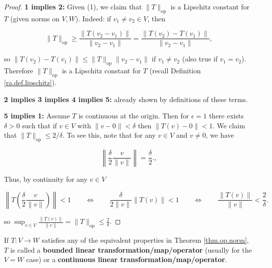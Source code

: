 \begin{proof}

\textbf{1 implies 2:} Given (1), we claim that \(\lVert T \rVert_{\text{op}}\) is a Lipschitz constant for \(T\) (given norms on \(V, W\)). Indeed: if \(v_1 \neq v_2 \in V\), then 

\[
\lVert T \rVert_\text{op} \geq  \frac{ \lVert T(v_2 -v_1) \rVert}{\lVert v_2 - v_1 \rVert} = \frac{ \lVert T(v_2) - T(v_1) \rVert}{\lVert v_2 - v_1 \rVert},
\]

so \( \lVert T(v_2) - T(v_1) \rVert \leq \lVert T \rVert_{\text{op}} \lVert v_2 - v_1 \rVert\) if \(v_1 \neq v_2\) (also true if \(v_1 = v_2\)). Therefore \(\lVert T \rVert_{\text{op}}\) is a Lipschitz constant for \(T\) (recall Definition \ref{ra.def.lipschitz}).

\textbf{2 implies 3 implies 4 implies 5:} already shown by definitions of these terms.

\textbf{5 implies 1:} Assume \(T\) is continuous at the origin. Then for \(\epsilon = 1\) there exists \(\delta > 0\) such that if \(v \in V\) with \(\lVert v - 0 \rVert < \delta\) then \(\lVert T(v) - 0 \rVert < 1\). We claim that \(\lVert T \rVert_{\text{op}} \leq 2/\delta\). To see this, note that for any \(v  \in V\) and \(v \neq 0\), we have

\[
\left\lVert  \frac{\delta}{2} \frac{v}{\lVert v \rVert} \right\rVert = \frac{\delta}{2} .,
\]

Thus, by continuity for any \(v \in V\)

\[
\left\lVert T \left( \frac{\delta}{2} \frac{v}{\lVert v \rVert}  \right) \right\rVert < 1 \qquad \iff \qquad \frac{\delta}{2\lVert v \rVert} \left\lVert T \left(  v \right) \right\rVert < 1 \qquad \iff \qquad  \frac{\left\lVert T \left(  v \right) \right\rVert }{ \lVert v \rVert} < \frac{2}{\delta}.
\]

so \(\sup_{v \in V} \frac{ \lVert T(v) \rVert}{\lVert v \rVert} = \lVert T \rVert_\text{op} \leq \frac{2}{\delta}\).

\end{proof}

\begin{definition}

If \(T: V \to W\) satisfies any of the equivalent properties in Theorem \ref{thm.op.norm}, \(T\) is called a \textbf{bounded linear transformation/map/operator} (usually for the \(V = W\) case) or a \textbf{continuous linear transformation/map/operator}.

\end{definition}

